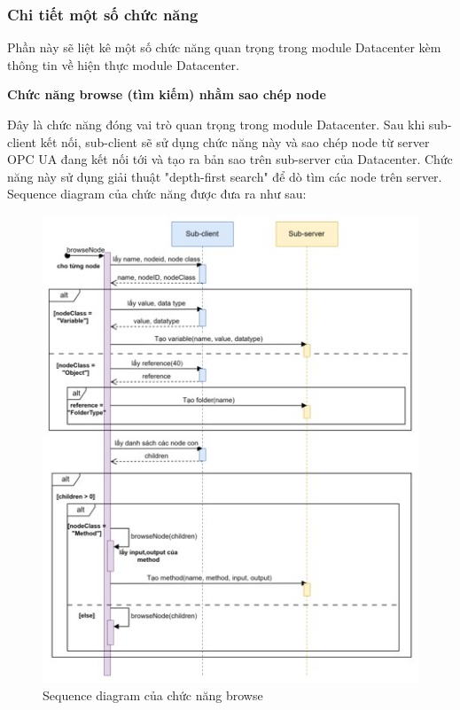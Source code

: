 \subsubsection{Chi tiết một số chức năng}

Phần này sẽ liệt kê một số chức năng quan trọng trong module Datacenter kèm thông tin về hiện thực module Datacenter.

\textbf{Chức năng browse (tìm kiếm) nhằm sao chép node} 

Đây là chức năng đóng vai trò quan trọng trong module Datacenter. Sau khi sub-client kết nối, sub-client sẽ sử dụng chức năng này và sao chép node từ server OPC UA đang kết nối tới và tạo ra bản sao trên sub-server của Datacenter. Chức năng này sử dụng giải thuật "depth-first search" để dò tìm các node trên server. Sequence diagram của chức năng được đưa ra như sau:

\begin{figure}[H]
    \centering
    \includegraphics[]{Images/Implementation/Datacenter/Datacenter_browseNode.jpg}
    \caption{Sequence diagram của chức năng browse}
    \label{fig:seq_diag_Datacenter_browse}
\end{figure}

